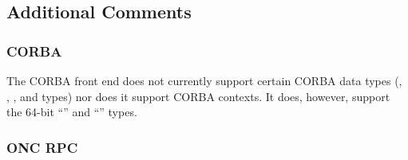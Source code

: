 

\subsection{Additional Comments}
\label{subsec:FE:Additional Comments}

\subsubsection{CORBA}
\label{subsubsec:FE:CORBA}


The CORBA front end does not currently support certain CORBA data types
(, , , and  types) nor does it
support CORBA contexts.  It does, however, support the 64-bit ``'' and ``'' types.

\subsubsection{ONC RPC}
\label{subsubsec:FE:ONC RPC}

